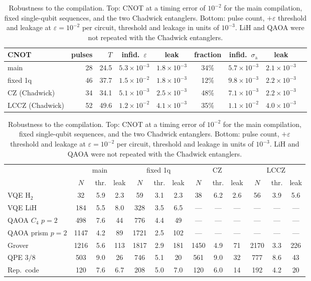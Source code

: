 \documentclass[reprint,aps,pra,amsmath,amssymb,superscriptaddress,letterpaper]{revtex4-2}
\begin{document}
\begin{table}[t]
\centering\small
\caption{Robustness to the compilation. Top: CNOT at a timing error of
$10^{-2}$ for the main compilation, fixed single-qubit sequences, and the two
Chadwick entanglers. Bottom: pulse count, $+\varepsilon$ threshold and
leakage at $\varepsilon=10^{-2}$ per circuit, threshold and leakage in units of $10^{-3}$. LiH and QAOA were not repeated with
the Chadwick entanglers.}
\label{tab:var}
\begin{tabular}{lrrcccccc}
\toprule
CNOT & pulses & $T$ & infid.\ $\varepsilon$ & leak & fraction & infid.\ $\sigma_{\mathrm a}$ & leak\\
\midrule
main & 28 & 24.5 & $5.3\times10^{-3}$ & $1.8\times10^{-3}$ & 34\% & $5.7\times10^{-3}$ & $2.1\times10^{-3}$ \\
fixed 1q & 46 & 37.7 & $1.5\times10^{-2}$ & $1.8\times10^{-3}$ & 12\% & $9.8\times10^{-3}$ & $2.2\times10^{-3}$ \\
CZ (Chadwick) & 34 & 34.1 & $5.1\times10^{-3}$ & $2.5\times10^{-3}$ & 48\% & $7.1\times10^{-3}$ & $2.2\times10^{-3}$ \\
LCCZ (Chadwick) & 52 & 49.6 & $1.2\times10^{-2}$ & $4.1\times10^{-3}$ & 35\% & $1.1\times10^{-2}$ & $4.0\times10^{-3}$ \\
\bottomrule
\end{tabular}

\medskip
{\setlength{\tabcolsep}{3.5pt}
\begin{tabular}{lccc|ccc|ccc|ccc}
\toprule
 & \multicolumn{3}{c|}{main} & \multicolumn{3}{c|}{fixed 1q} & \multicolumn{3}{c|}{CZ} & \multicolumn{3}{c}{LCCZ}\\
 & $N$ & thr. & leak & $N$ & thr. & leak & $N$ & thr. & leak & $N$ & thr. & leak\\
\midrule
VQE H$_2$ & 32 & 5.9 & 2.3 & 59 & 3.1 & 2.3 & 38 & 6.2 & 2.6 & 56 & 3.9 & 5.6 \\
VQE LiH & 184 & 5.5 & 8.0 & 328 & 3.5 & 6.5 & --- & --- & --- & --- & --- & --- \\
QAOA $C_4$ $p{=}2$ & 498 & 7.6 & 44 & 776 & 4.4 & 49 & --- & --- & --- & --- & --- & --- \\
QAOA prism $p{=}2$ & 1147 & 4.2 & 89 & 1721 & 2.5 & 102 & --- & --- & --- & --- & --- & --- \\
Grover & 1216 & 5.6 & 113 & 1817 & 2.9 & 181 & 1450 & 4.9 & 71 & 2170 & 3.3 & 226 \\
QPE $3/8$ & 503 & 9.0 & 26 & 746 & 5.1 & 20 & 561 & 9.0 & 32 & 777 & 8.6 & 43 \\
Rep.\ code & 120 & 7.6 & 6.7 & 208 & 5.0 & 7.0 & 120 & 6.0 & 14 & 192 & 4.2 & 20 \\
\bottomrule
\end{tabular}}
\end{table}
\end{document}
